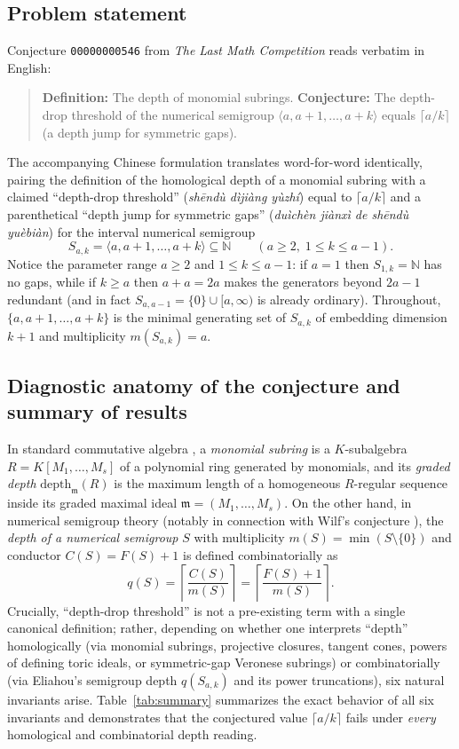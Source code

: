 \documentclass[11pt]{amsart}
\theoremstyle{definition}
\theoremstyle{remark}
\newcommand{\NN}{\mathbb{N}}
\newcommand{\mm}{\mathfrak{m}}
\newcommand{\depth}{\mathrm{depth}}
\newcommand{\ceil}[1]{\left\lceil #1 \right\rceil}
\begin{document}
\subsection{Problem statement}
Conjecture \texttt{00000000546} from \emph{The Last Math Competition} reads verbatim in English:
\begin{quote}
\textbf{Definition:} The depth of monomial subrings. \textbf{Conjecture:} The depth-drop threshold of the numerical semigroup $\langle a, a+1, \dots, a+k \rangle$ equals $\lceil a/k \rceil$ (a depth jump for symmetric gaps).
\end{quote}
The accompanying Chinese formulation translates word-for-word identically, pairing the definition of the homological $\depth$ of a monomial subring with a claimed ``depth-drop threshold'' (\emph{sh\=end\`u d\`iji\`ang y\`uzh\'i}) equal to $\lceil a/k \rceil$ and a parenthetical ``depth jump for symmetric gaps'' (\emph{du\`ich\`en ji\`anx\`i de sh\=end\`u yu\`ebi\`an}) for the interval numerical semigroup
\[
  S_{a,k} = \langle a, a+1, \dots, a+k \rangle \subseteq \NN \qquad (a \ge 2,\; 1 \le k \le a - 1).
\]
Notice the parameter range $a \ge 2$ and $1 \le k \le a-1$: if $a = 1$ then $S_{1,k} = \NN$ has no gaps, while if $k \ge a$ then $a+a = 2a$ makes the generators beyond $2a-1$ redundant (and in fact $S_{a,a-1} = \{0\} \cup [a, \infty)$ is already ordinary). Throughout, $\{a, a+1, \dots, a+k\}$ is the minimal generating set of $S_{a,k}$ of embedding dimension $k + 1$ and multiplicity $m(S_{a,k}) = a$.

\subsection{Diagnostic anatomy of the conjecture and summary of results}
In standard commutative algebra \cite{BrunsHerzog1998,Villarreal2015}, a \emph{monomial subring} is a $K$-subalgebra $R = K[M_1, \dots, M_s]$ of a polynomial ring generated by monomials, and its \emph{graded depth} $\depth_{\mm}(R)$ is the maximum length of a homogeneous $R$-regular sequence inside its graded maximal ideal $\mm = (M_1, \dots, M_s)$. On the other hand, in numerical semigroup theory (notably in connection with Wilf's conjecture \cite{Eliahou2018}), the \emph{depth of a numerical semigroup} $S$ with multiplicity $m(S) = \min(S \setminus \{0\})$ and conductor $C(S) = F(S) + 1$ is defined combinatorially as
\[
  q(S) = \ceil{\frac{C(S)}{m(S)}} = \ceil{\frac{F(S) + 1}{m(S)}}.
\]
Crucially, ``depth-drop threshold'' is not a pre-existing term with a single canonical definition; rather, depending on whether one interprets ``depth'' homologically (via monomial subrings, projective closures, tangent cones, powers of defining toric ideals, or symmetric-gap Veronese subrings) or combinatorially (via Eliahou's semigroup depth $q(S_{a,k})$ and its power truncations), six natural invariants arise. Table~\ref{tab:summary} summarizes the exact behavior of all six invariants and demonstrates that the conjectured value $\lceil a/k \rceil$ fails under \emph{every} homological and combinatorial depth reading.
\end{document}
